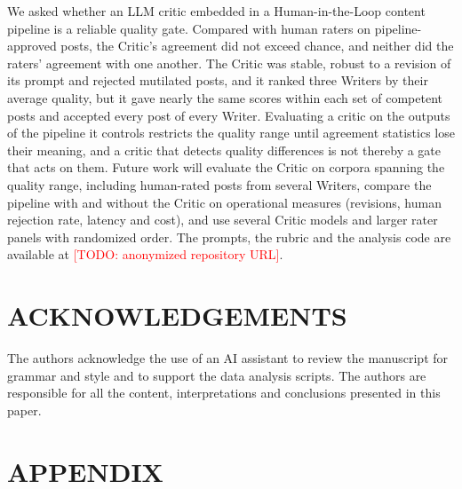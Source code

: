 \documentclass[a4paper,twoside]{article}
\newcommand{\TODO}[1]{\textcolor{red}{[TODO: #1]}}
\begin{document}
We asked whether an LLM critic embedded in a Human-in-the-Loop content pipeline is a reliable quality gate. Compared with \NRaters{} human raters on \NPosts{} pipeline-approved posts, the Critic's agreement did not exceed chance, and neither did the raters' agreement with one another. The Critic was stable, robust to a revision of its prompt and rejected mutilated posts, and it ranked three Writers by their average quality, but it gave nearly the same scores within each set of competent posts and accepted every post of every Writer. Evaluating a critic on the outputs of the pipeline it controls restricts the quality range until agreement statistics lose their meaning, and a critic that detects quality differences is not thereby a gate that acts on them. Future work will evaluate the Critic on corpora spanning the quality range, including human-rated posts from several Writers, compare the pipeline with and without the Critic on operational measures (revisions, human rejection rate, latency and cost), and use several Critic models and larger rater panels with randomized order. The prompts, the rubric and the analysis code are available at \TODO{anonymized repository URL}.

\section*{\uppercase{Acknowledgements}}

The authors acknowledge the use of an AI assistant to review the manuscript for grammar and style and to support the data analysis scripts. The authors are responsible for all the content, interpretations and conclusions presented in this paper.


{\small
}

\section*{\uppercase{Appendix}}
\end{document}
